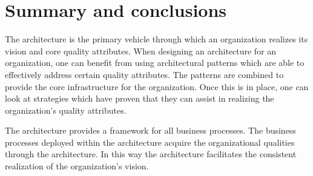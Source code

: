 \documentclass[11pt,english,a4]{article}
\begin{document}
\section{Summary and conclusions}

The architecture is the primary vehicle through which an organization realizes its vision and core quality attributes. When designing an architecture for an organization, one can benefit from using architectural patterns which are able to effectively address certain quality attributes. The patterns are combined to provide the core infrastructure for the organization. Once this is in place, one can look at strategies which have proven that they can assist in realizing the organization's quality attributes.

The architecture provides a framework for all business processes. The business processes deployed within the architecture acquire the organizational qualities through the architecture. In this way the architecture facilitates the consistent realization of the organization's vision.
\end{document}
